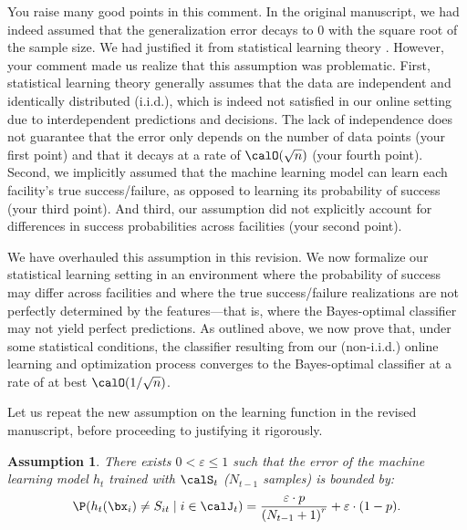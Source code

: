 \documentclass[11pt]{article}
\newtheorem{assumption}{Assumption}[]
\begin{document}
You raise many good points in this comment. In the original manuscript, we had indeed assumed that the generalization error decays to 0 with the square root of the sample size. We had justified it from statistical learning theory \citep[using, for instance][]{chaudhuri2014rates,ng2001discriminative,mansour2000generalization,ng2001discriminative,gao2020towards}. However, your comment made us realize that this assumption was problematic. First, statistical learning theory generally assumes that the data are independent and identically distributed (i.i.d.), which is indeed not satisfied in our online setting due to interdependent predictions and decisions. The lack of independence does not guarantee that the error only depends on the number of data points (your first point) and that it decays at a rate of $\calO(\sqrt n)$ (your fourth point). Second, we implicitly assumed that the machine learning model can learn each facility's true success/failure, as opposed to learning its probability of success (your third point). And third, our assumption did not explicitly account for differences in success probabilities across facilities (your second point).

We have overhauled this assumption in this revision. We now formalize our statistical learning setting in an environment where the probability of success may differ across facilities and where the true success/failure realizations are not perfectly determined by the features---that is, where the Bayes-optimal classifier may not yield perfect predictions. As outlined above, we now prove that, under some statistical conditions, the classifier resulting from our (non-i.i.d.) online learning and optimization process converges to the Bayes-optimal classifier at a rate of at best $\calO(1/\sqrt{n})$.

Let us repeat the new assumption on the learning function in the revised manuscript, before proceeding to justifying it rigorously.
\setcounter{assumption}{3}
\begin{assumption}\label{ass:classification_R2}
    There exists $0<\varepsilon\leq 1$ such that the error of the machine learning model $h_t$ trained with $\calS_t$ ($N_{t-1}$ samples) is bounded by:
    \begin{align*}
        \P(h_t(\bx_{i})\neq S_{it} \mid i \in \calJ_t)=\frac{\varepsilon\cdot p}{\left(N_{t-1} + 1\right)^r}+\varepsilon\cdot(1-p).
    \end{align*}
\end{assumption}
\end{document}
